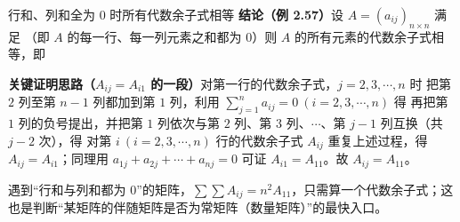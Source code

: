 \begin{fdeep}{行和、列和全为 $0$ 时所有代数余子式相等}
\textbf{结论（例 2.57）}\quad 设 $A=(a_{ij})_{n\times n}$ 满足
（即 $A$ 的每一行、每一列元素之和都为 $0$）则 $A$ 的所有元素的代数余子式相等，即

\textbf{关键证明思路（$A_{ij}=A_{i1}$ 的一段）}\quad 对第一行的代数余子式，$j=2,3,\cdots,n$ 时
把第 $2$ 列至第 $n-1$ 列都加到第 $1$ 列，利用 $\sum\limits_{j=1}^{n}a_{ij}=0\ (i=2,3,\cdots,n)$ 得
再把第 $1$ 列的负号提出，并把第 $1$ 列依次与第 $2$ 列、第 $3$ 列、$\cdots$、第 $j-1$ 列互换（共 $j-2$ 次），得
对第 $i\ (i=2,3,\cdots,n)$ 行的代数余子式 $A_{ij}$ 重复上述过程，得 $A_{ij}=A_{i1}$；同理用 $a_{1j}+a_{2j}+\cdots+a_{nj}=0$ 可证 $A_{i1}=A_{11}$。故 $A_{ij}=A_{11}$。

\textbf{\fbref{}}遇到“行和与列和都为 $0$”的矩阵，$\sum\sum A_{ij}=n^{2}A_{11}$，只需算一个代数余子式；这也是判断“某矩阵的伴随矩阵是否为常矩阵（数量矩阵）”的最快入口。
\end{fdeep}

